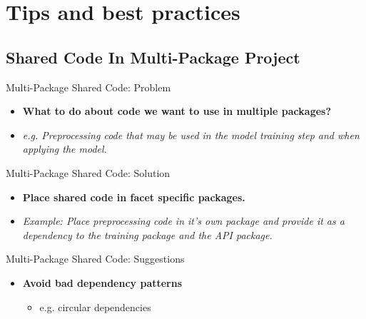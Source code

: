 \documentclass[10pt]{beamer}
\begin{document}

\section{Tips and best practices}



\subsection{Shared Code In Multi-Package Project}

\begin{frame}[fragile]{Multi-Package Shared Code: Problem}

  \begin{itemize}
    \item \textbf{What to do about code we want to use in multiple packages?}
    \item \textit{e.g. Preprocessing code that may be used in the model training step and when applying the model.}
  \end{itemize}
\end{frame}

\begin{frame}[fragile]{Multi-Package Shared Code: Solution}

  \begin{itemize}
    \item \textbf{Place shared code in facet specific packages.}
    \item \textit{Example: Place preprocessing code in it's own package and provide it as a dependency to the training package and the API package.}
  \end{itemize}

\end{frame}

\begin{frame}[fragile]{Multi-Package Shared Code: Suggestions}
  \begin{itemize}
    \item \textbf{Avoid bad dependency patterns}
      \begin{itemize}
        \item e.g. circular dependencies
      \end{itemize}
  \end{itemize}

\end{frame}
\end{document}

